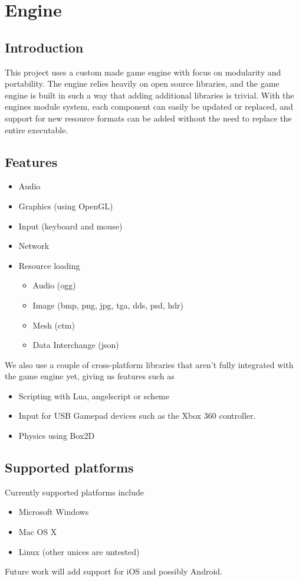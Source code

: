 
\chapter{Engine}
\section{Introduction}
This project uses a custom made game engine with focus on modularity and portability. The engine relies heavily on open source libraries, and the game engine is built in such a way that adding additional libraries is trivial. With the engines module system, each component can easily be updated or replaced, and support for new resource formats can be added without the need to replace the entire executable.

 \section{Features}
 \begin{itemize}
 \item Audio
 \item Graphics (using OpenGL)
 \item Input (keyboard and mouse)
 \item Network
 \item Resource loading
 	\begin{itemize}
 		\item Audio (ogg)
 		\item Image (bmp, png, jpg, tga, dds, psd, hdr)
 		\item Mesh (ctm)
 		\item Data Interchange (json)
 	\end{itemize}
 \end{itemize}

We also use a couple of cross-platform libraries that aren't fully integrated with the game engine yet, giving us features such as
\begin{itemize}
\item Scripting with Lua, angelscript or scheme
\item Input for USB Gamepad devices such as the Xbox 360 controller.
\item Physics using Box2D
\end{itemize}

\section{Supported platforms}
Currently supported platforms include
\begin{itemize}
\item Microsoft Windows
\item Mac OS X
\item Linux (other unices are untested)
\end{itemize}
Future work will add support for iOS and possibly Android.
